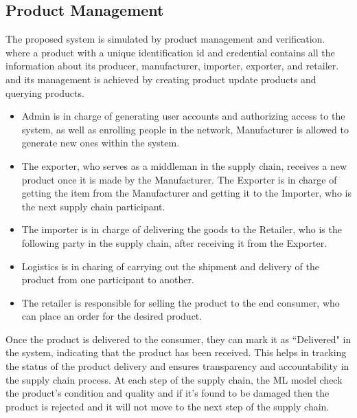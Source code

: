 \subsection{Product Management}
\indent The proposed system is simulated by product management and verification. where a product with a unique identification id and credential contains all the information about its producer, manufacturer, importer, exporter, and retailer.
and its management is achieved by creating product update products and querying products.
\begin{itemize} 
\item	Admin is in charge of generating user accounts and authorizing access to the system, as well as enrolling people in the network, Manufacturer is allowed to generate new ones within the system.
\item	The exporter, who serves as a middleman in the supply chain, receives a new product once it is made by the Manufacturer. The Exporter is in charge of getting the item from the Manufacturer and getting it to the Importer, who is the next supply chain participant.
\item	 The importer is in charge of delivering the goods to the Retailer, who is the following party in the supply chain, after receiving it from the Exporter. 
\item	Logistics is in charing of carrying out the shipment and delivery of the product from one participant to another.
\item	The retailer is responsible for selling the product to the end consumer, who can place an order for the desired product.
\end{itemize}
\indent Once the product is delivered to the consumer, they can mark it as ``Delivered" in the system, indicating that the product has been received. This helps in tracking the status of the product delivery and ensures transparency and accountability in the supply chain process.
At each step of the supply chain, the ML model check the product's condition and quality and if it's found to be damaged then the product is rejected and it will not move to the next step of the supply chain.
